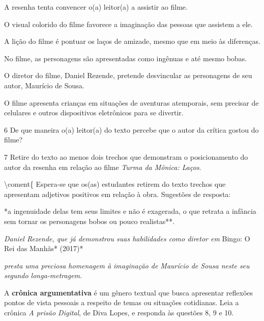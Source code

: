\begin{boxlist}
 A resenha tenta convencer o(a) leitor(a) a assistir ao filme.

 O visual colorido do filme favorece a imaginação das pessoas que
assistem a ele.

 A lição do filme é pontuar os laços de amizade, mesmo que em meio às
diferenças.

 No filme, as personagens são apresentadas como ingênuas e até mesmo
bobas.

 O diretor do filme, Daniel Rezende, pretende desvincular as
personagens de seu autor, Maurício de Sousa.

 O filme apresenta crianças em situações de aventuras atemporais, sem
precisar de celulares e outros dispositivos eletrônicos para se
divertir.
\end{boxlist}


\num{6} De que maneira o(a) leitor(a) do texto percebe que o autor da
crítica gostou do filme?


\num{7} Retire do texto ao menos dois trechos que demonstram o
posicionamento do autor da resenha em relação ao filme \emph{Turma da
Mônica: Laços}.

\textbackslash coment\{ Espera-se que os(as) estudantes retirem do texto
trechos que apresentam adjetivos positivos em relação à obra. Sugestões
de resposta:

*a ingenuidade delas tem seus limites e não é exagerada, o que retrata a
infância sem tornar os personagens bobos ou pouco realistas**.

\emph{Daniel Rezende, que já demonstrou suas habilidades como diretor em
}Bingo: O Rei das Manhãs* (2017)*

\emph{presta uma preciosa homenagem à imaginação de Maurício de Sousa
neste seu segundo longa-metragem.}

A \textbf{crônica argumentativa} é um gênero textual que busca
apresentar reflexões pontos de vista pessoais a respeito de temas ou
situações cotidianas. Leia a crônica \emph{A prisão Digital}, de Diva
Lopes, e responda às questões 8, 9 e 10.

